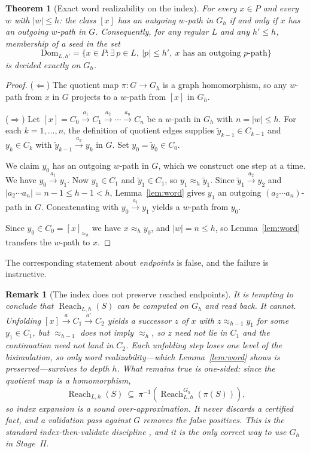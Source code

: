 \documentclass[11pt]{article}
\newtheorem{theorem}[definition]{Theorem}
\newtheorem{remark}[definition]{Remark}
\newcommand{\Reach}{\operatorname{Reach}}
\begin{document}
\begin{theorem}[Exact word realizability on the index]
\label{thm:index-exact}
For every $x\in P$ and every $w$ with $|w|\le h$: the class $[x]$ has an outgoing $w$-path in $G_h$ if and only if $x$ has an outgoing $w$-path in $G$. Consequently, for any regular $L$ and any $h'\le h$, membership of a seed in the set
\[
\mathrm{Dom}_{L,h'}=\{x\in P:\exists\, p\in L,\ |p|\le h',\ x\text{ has an outgoing }p\text{-path}\}
\]
is decided exactly on $G_h$.
\end{theorem}
\begin{proof}
($\Leftarrow$) The quotient map $\pi: G\to G_h$ is a graph homomorphism, so any $w$-path from $x$ in $G$ projects to a $w$-path from $[x]$ in $G_h$.

($\Rightarrow$) Let $[x]=C_0\xrightarrow{a_1}C_1\xrightarrow{a_2}\cdots\xrightarrow{a_n}C_n$ be a $w$-path in $G_h$ with $n=|w|\le h$. For each $k=1,\dots,n$, the definition of quotient edges supplies $\tilde{y}_{k-1}\in C_{k-1}$ and $y_k\in C_k$ with $\tilde{y}_{k-1}\xrightarrow{a_k}y_k$ in $G$. Set $y_0=\tilde{y}_0\in C_0$.

We claim $y_0$ has an outgoing $w$-path in $G$, which we construct one step at a time. We have $y_0\xrightarrow{a_1}y_1$. Now $y_1\in C_1$ and $\tilde{y}_1\in C_1$, so $y_1\approx_h\tilde{y}_1$. Since $\tilde{y}_1\xrightarrow{a_2}y_2$ and $|a_2\cdots a_n|=n-1\le h-1<h$, Lemma~\ref{lem:word} gives $y_1$ an outgoing $(a_2\cdots a_n)$-path in $G$. Concatenating with $y_0\xrightarrow{a_1}y_1$ yields a $w$-path from $y_0$.

Since $y_0\in C_0=[x]_{\approx_h}$ we have $x\approx_h y_0$, and $|w|=n\le h$, so Lemma~\ref{lem:word} transfers the $w$-path to $x$.
\end{proof}

The corresponding statement about \emph{endpoints} is false, and the failure is instructive.

\begin{remark}[The index does not preserve reached endpoints]
\label{rem:index-caveat}
It is tempting to conclude that $\Reach_{L,h}(S)$ can be computed on $G_h$ and read back. It cannot. Unfolding $[x]\xrightarrow{a}C_1\xrightarrow{a'}C_2$ yields a successor $z$ of $x$ with $z\approx_{h-1}y_1$ for some $y_1\in C_1$, but $\approx_{h-1}$ does not imply $\approx_h$, so $z$ need not lie in $C_1$ and the continuation need not land in $C_2$. Each unfolding step loses one level of the bisimulation, so only word realizability---which Lemma~\ref{lem:word} shows is preserved---survives to depth $h$. What remains true is one-sided: since the quotient map is a homomorphism,
\[
\Reach_{L,h}(S)\ \subseteq\ \pi^{-1}\!\left(\Reach^{G_h}_{L,h}(\pi(S))\right),
\]
so index expansion is a \emph{sound over-approximation}. It never discards a certified fact, and a validation pass against $G$ removes the false positives. This is the standard index-then-validate discipline \citep{kaushik2002}, and it is the only correct way to use $G_h$ in Stage~II.
\end{remark}
\end{document}
